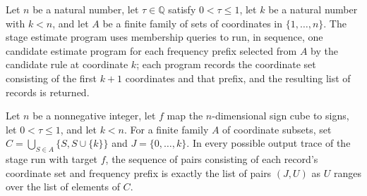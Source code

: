 \begin{definition}
\label{FABL.goldreichLevinStageEstimateProgram}
\leanok
{}
Let $n$ be a natural number, let $\tau\in\mathbb{Q}$ satisfy $0<\tau\leq 1$, let $k$ be
a natural number with $k<n$, and let $A$ be a finite family of sets of coordinates in
$\{1,\ldots,n\}$. The stage estimate program uses membership queries to run, in
sequence, one candidate estimate program for each frequency prefix selected from $A$ by
the candidate rule at coordinate $k$; each program records the coordinate set consisting
of the first $k+1$ coordinates and that prefix, and the resulting list of records is
returned.
\end{definition}

\begin{theorem}
\label{FABL.goldreichLevinStageEstimateProgram_output_keys}
\leanok
{}
Let $n$ be a nonnegative integer, let $f$ map the $n$-dimensional sign cube to signs,
let $0<\tau\le1$, and let $k<n$. For a finite family $A$ of coordinate subsets, set
$C=\bigcup_{S\in A}\{S,S\cup\{k\}\}$ and $J=\{0,\ldots,k\}$. In every possible
output trace of the stage run with target $f$, the sequence of pairs consisting of each
record's coordinate set and frequency prefix is exactly the list of pairs $(J,U)$ as $U$
ranges over the list of elements of $C$.
\end{theorem}

